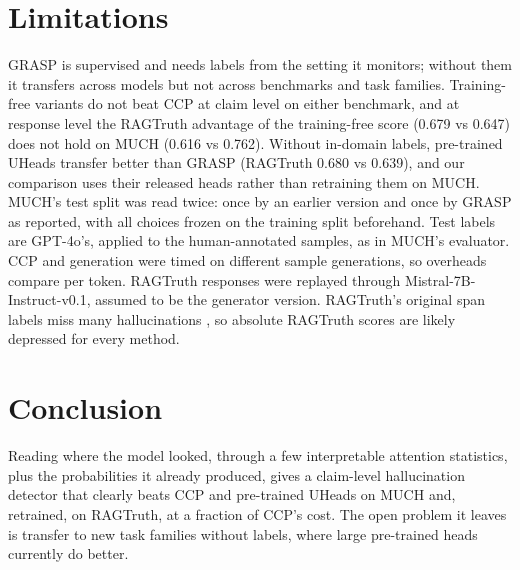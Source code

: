 \documentclass[11pt]{article}
\begin{document}
\section{Limitations}
\label{sec:limits}
GRASP is supervised and needs labels from the setting it monitors; without them it transfers
across models but not across benchmarks and task families. Training-free variants do not beat
CCP at claim level on either benchmark, and at response level the RAGTruth advantage of the
training-free score (0.679 vs 0.647) does not hold on MUCH (0.616 vs 0.762). Without in-domain
labels, pre-trained UHeads transfer better than GRASP (RAGTruth 0.680 vs 0.639), and our
comparison uses their released heads rather than retraining them on MUCH. MUCH's test split was
read twice: once by an earlier version and once by GRASP as reported, with all choices frozen on
the training split beforehand. Test labels are GPT-4o's, applied to the human-annotated samples, as
in MUCH's evaluator. CCP and generation were timed on different sample generations, so overheads
compare per token. RAGTruth responses were replayed through Mistral-7B-Instruct-v0.1, assumed to
be the generator version. RAGTruth's original span labels miss many hallucinations \citep{yu2026rt4chart}, so absolute RAGTruth scores are likely depressed for every method.

\section{Conclusion}
Reading where the model looked, through a few interpretable attention statistics, plus the
probabilities it already produced, gives a claim-level hallucination detector that clearly beats
CCP and pre-trained UHeads on MUCH and, retrained, on RAGTruth, at a fraction of CCP's cost. The
open problem it leaves is transfer to new task families without labels, where large pre-trained
heads currently do better.



\end{document}
